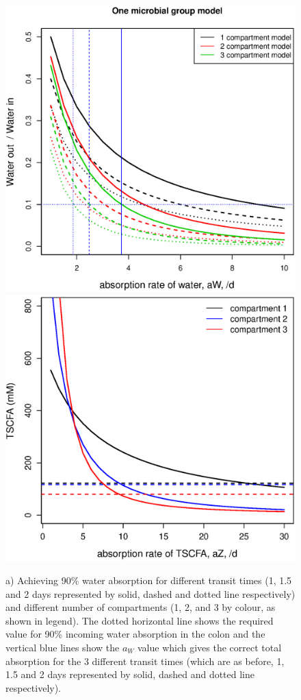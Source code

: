 \documentclass[a4paper]{article}
\begin{document}

\begin{figure}
    \centering
    \includegraphics[scale=0.32]{images/aW.eps}
    \includegraphics[scale=0.32]{images/aZconstant.eps}
    \caption{a) Achieving 90\% water absorption for different transit times (1, 1.5 and 2 days represented by solid, dashed and dotted line respectively) and different number of compartments (1, 2, and 3 by colour, as shown in legend). The dotted horizontal line shows the required value for 90\% incoming water absorption in the colon and the vertical blue lines show the $a_W$ value which gives the correct total absorption for the 3 different transit times (which are as before, 1, 1.5 and 2 days represented by solid, dashed and dotted line respectively). 
}
\end{figure}
\end{document}
